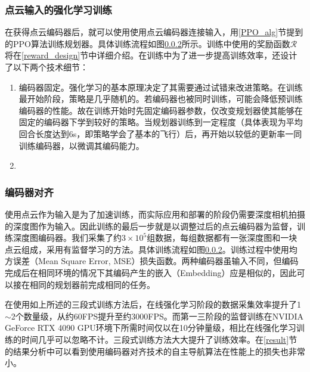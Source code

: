 \subsubsection{点云输入的强化学习训练}
在获得点云编码器后，就可以使用使用点云编码器连接输入，用\ref{PPO_alg}节提到的PPO算法训练规划器。具体训练流程如图\ref{}所示。训练中使用的奖励函数$\mathcal{R}$将在\ref{reward_design}节中详细介绍。在训练中为了进一步提高训练效率，还设计了以下两个技术细节：
\begin{enumerate}
  \item 编码器固定。强化学习的基本原理决定了其需要通过试错来改进策略。在训练最开始阶段，策略是几乎随机的。若编码器也被同时训练，可能会降低预训练编码器的性能。故在训练开始时先固定编码器参数，仅改变规划器使其能够在固定的编码器下学到较好的策略。当规划器训练到一定程度（具体表现为平均回合长度达到6s，即策略学会了基本的飞行）后，再开始以较低的更新率一同训练编码器，以微调其编码能力。
  \item 
\end{enumerate}

\subsubsection{编码器对齐}

使用点云作为输入是为了加速训练，而实际应用和部署的阶段仍需要深度相机拍摄的深度图作为输入。因此训练的最后一步就是以调整过后的点云编码器为监督，训练深度图编码器。我们采集了约$3\times 10^5$组数据，每组数据都有一张深度图和一块点云组成，采用有监督学习的方法。具体训练流程如图\ref{}。训练过程中使用均方误差（Mean Square Error, MSE）损失函数。两种编码器虽输入不同，但编码完成后在相同环境的情况下其编码产生的嵌入（Embedding）应是相似的，因此可以接在相同的规划器前完成相同的任务。

在使用如上所述的三段式训练方法后，在线强化学习阶段的数据采集效率提升了1$\sim$2个数量级，从约60FPS提升至约3000FPS。而第一三阶段的监督训练在NVIDIA GeForce RTX 4090 GPU环境下所需时间仅以在10分钟量级，相比在线强化学习训练的时间几乎可以忽略不计。三段式训练方法大大提升了训练效率。在\ref{result}节的结果分析中可以看到使用编码器对齐技术的自主导航算法在性能上的损失也非常小。

